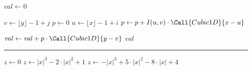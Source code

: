 \begin{program}
\caption{Source code for Algorithm~\ref{alg:Example}. As you can see, empty
lines can be used here as well, which significantly improves readability.}
\label{prog:AlgExample}
\begin{LaTeXCode}
\begin{algorithm}
\caption{Example of an algorithm for bicubic interpolation in 2D typeset 
with the package \texttt{algpseudocodex} (from \cite{BurgerBurge2022}).
Function $\Call{Cubic1D}{x}$, used in lines \ref{alg:wcub1} and 
\ref{alg:wcub2}, calculates the weight given to the interpolation value at 
some one-dimensional position $x$.}
\label{alg:Example}

\begin{algorithmic}[1]     %
 
	
	\State $\mathit{val} \gets 0$
	
	 
		\State $v \gets \lfloor y \rfloor - 1 + j$
		\State $p \gets 0$
		 
			\State $u \gets \lfloor x \rfloor - 1 + i$
			\State $p \gets p + I(u,v) \cdot \Call{Cubic1D}{x - u}$	\label{alg:wcub1}
		\EndFor		
		
		
		\State $\mathit{val} \gets \mathit{val} + p \cdot \Call{Cubic1D}{y - v}$
				\label{alg:wcub2}
	\EndFor
	\State\Return $\mathit{val}$
\EndFunction

\medskip	%
\hrule

 
	\State $z \gets 0$
			\State $z \gets |x|^3 - 2 \cdot |x|^2 + 1$
			\State $z \gets -|x|^3 + 5 \cdot |x|^2 - 8 \cdot |x| + 4$
		\EndIf
		\State{}
\EndFunction

\end{algorithmic}
\end{algorithm}
\end{LaTeXCode}
\end{program}
